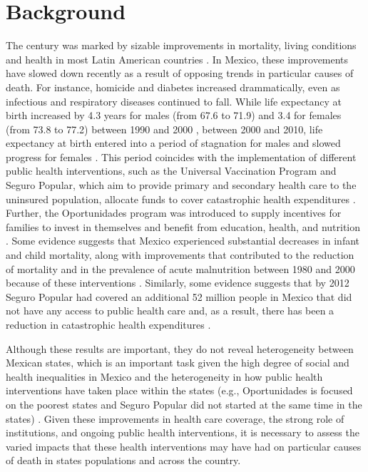 \documentclass{article}
\begin{document}
\section*{Background}
The  century was marked by sizable improvements in mortality, living
conditions and health in most Latin American countries \citep{who2000}. In
Mexico, these improvements have slowed down recently as a result of opposing
trends in particular causes of death. For instance, homicide and diabetes
increased drammatically, even as infectious and
respiratory diseases continued to fall. While life
expectancy at birth increased by 4.3 years for males (from 67.6 to 71.9) and 3.4
for females (from 73.8 to 77.2) between 1990 and 2000 \citep{SOMEDE},
between 2000 and 2010, life expectancy at birth entered into a period of
stagnation for males and slowed progress for females \citep{canudas2014}. This
period coincides with the implementation of different public health
interventions, such as the Universal Vaccination Program and Seguro
Popular, which aim to provide primary and secondary
health care to the uninsured population, allocate funds to cover catastrophic
health expenditures \citep{knaul2005}. Further, the Oportunidades program
was introduced to supply incentives for families to invest in themselves and
benefit from education, health, and nutrition \citep{neufeld2012}. Some evidence
suggests that Mexico experienced substantial decreases in infant and child
mortality, along with improvements that contributed to the reduction of
mortality and in the prevalence of acute malnutrition between 1980 and 2000
because of these interventions \citep{sepulveda2006}. Similarly, some evidence
suggests that by 2012 Seguro Popular had covered an additional 52 million
people in Mexico that did not have any access to public health care and, as a result, there has been a reduction in catastrophic health expenditures \citep{knaul2012}.

 Although these results are important, they do not reveal heterogeneity between
 Mexican states, which is an important task given the high degree of social and
 health inequalities in Mexico and the heterogeneity in how public health interventions have taken place within the states (e.g., Oportunidades is focused on the poorest states and Seguro Popular did not started at the same time in the states) \citep{Frenk2006}.  Given these improvements
 in health care coverage, the strong role of institutions, and ongoing public
 health interventions, it is necessary to assess the varied impacts that
 these health interventions may have had on particular causes of death in states
 populations and across the country.
 
\end{document}
